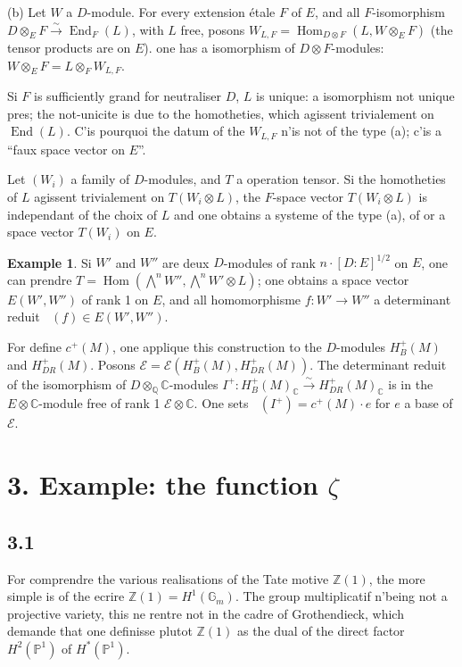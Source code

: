 \documentclass[12pt,a4paper]{article}
\theoremstyle{plain}
\theoremstyle{definition}
\newtheorem{example}[definition]{Example}
\theoremstyle{remark}
\DeclareMathOperator{\Hom}{Hom}
\DeclareMathOperator{\End}{End}
\DeclareMathOperator{\detred}{det^{red}}
\newcommand{\Q}{\mathbb{Q}}
\newcommand{\C}{\mathbb{C}}
\newcommand{\Z}{\mathbb{Z}}
\newcommand{\PP}{\mathbb{P}}
\begin{document}
(b) Let $W$ a $D$-module. For every extension étale $F$ of $E$, and all
$F$-isomorphism $D \otimes_E F \xrightarrow{\sim} \End_F(L)$, with $L$ free, posons
$W_{L,F} = \Hom_{D \otimes F}(L, W \otimes_E F)$ (the tensor products are on $E$). one has a
isomorphism of $D \otimes F$-modules: $W \otimes_E F = L \otimes_F W_{L,F}$.

Si $F$ is sufficiently grand for neutraliser $D$, $L$ is unique: a isomorphism not unique
pres; the not-unicite is due to the homotheties, which agissent trivialement on $\End(L)$.
C'is pourquoi the datum of the $W_{L,F}$ n'is not of the type (a); c'is a ``faux space
vector on $E$''.

Let $(W_i)$ a family of $D$-modules, and $T$ a operation tensor. Si the
homotheties of $L$ agissent trivialement on $T(W_i \otimes L)$, the $F$-space vector
$T(W_i \otimes L)$ is independant of the choix of $L$ and one obtains a systeme of the type (a), of or a space
vector $T(W_i)$ on $E$.

\begin{example}
Si $W'$ and $W''$ are deux $D$-modules of rank $n \cdot [D:\!E]^{1/2}$ on $E$, one can
prendre $T = \Hom(\bigwedge^n W'', \bigwedge^n W' \otimes L)$; one obtains a space vector
$E(W', W'')$ of rank 1 on $E$, and all homomorphisme $f: W' \to W''$ a determinant
reduit $\detred(f) \in E(W', W'')$.
\end{example}

For define $c^+(M)$, one applique this construction to the $D$-modules $H^+_B(M)$ and
$H^+_{DR}(M)$. Posons $\mathcal{E} = \mathcal{E}(H^+_B(M), H^+_{DR}(M))$. The determinant reduit of
the isomorphism of $D \otimes_\Q \C$-modules $I^+: H^+_B(M)_\C \xrightarrow{\sim} H^+_{DR}(M)_\C$
is in the $E \otimes \C$-module free of rank 1 $\mathcal{E} \otimes \C$. One sets
$\detred(I^+) = c^+(M) \cdot e$ for $e$ a base of $\mathcal{E}$.

\section*{3. Example: the function $\zeta$}

\subsection*{3.1}

For comprendre the various realisations of the Tate motive $\Z(1)$, the more simple is
of the ecrire $\Z(1) = H^1(\mathbb{G}_m)$. The group multiplicatif n'being not a projective variety, this ne rentre not in the cadre of Grothendieck, which demande that one
definisse plutot $\Z(1)$ as the dual of the direct factor $H^2(\PP^1)$ of $H^*(\PP^1)$.
\end{document}
